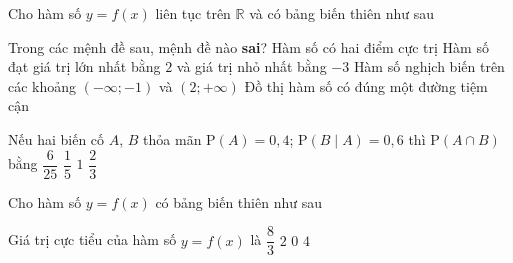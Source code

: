 \begin{ex}%
Cho hàm số $y=f(x)$ liên tục trên $\mathbb{R}$ và có bảng biến thiên như sau
\begin{center}
\end{center}
Trong các mệnh đề sau, mệnh đề nào \textbf{sai}?
\choice
{Hàm số có hai điểm cực trị}
{\True Hàm số đạt giá trị lớn nhất bằng $2$ và giá trị nhỏ nhất bằng $-3$}
{Hàm số nghịch biến trên các khoảng $\left(-\infty;-1\right)$ và $\left(2;+\infty\right)$}
{Đồ thị hàm số có đúng một đường tiệm cận}
\end{ex}

\begin{ex}%
Nếu hai biến cố $A$, $B$ thỏa mãn $\mathrm{P}\left(A\right)=0{,}4$; $\mathrm{P}\left(B\mid A\right)=0{,}6$ thì $\mathrm{P}\left(A\cap B\right)$ bằng
\choice
{$\dfrac{6}{25}$}
{$\dfrac{1}{5}$}
{$1$}
{$\dfrac{2}{3}$}
\end{ex}

\begin{ex}%
Cho hàm số $y=f(x)$ có bảng biến thiên như sau
\begin{center}
\end{center}
Giá trị cực tiểu của hàm số $y=f(x)$ là
\choice
{\True $\dfrac{8}{3}$}
{$2$}
{$0$}
{$4$}
\end{ex}

